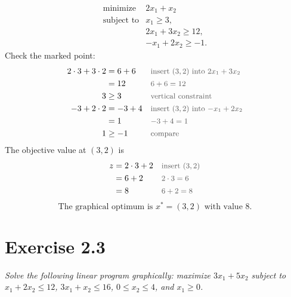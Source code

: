 \documentclass[a4paper,11pt]{article}
\newif\ifexplain
\newcommand{\aufgabe}[1]{\section*{#1}}
\newcommand{\angabe}[1]{\textit{#1}\par\smallskip}
\newcommand{\why}[1]{\text{\small\color{black!65}#1}}
\newcommand{\explain}[1]{\ifexplain\begin{erklbox}#1\end{erklbox}\fi}
\begin{document}
\[
\boxed{
\begin{array}{ll}
\text{minimize} & 2x_1+x_2\\[1mm]
\text{subject to} & x_1\ge3,\\
& 2x_1+3x_2\ge12,\\
& -x_1+2x_2\ge-1.
\end{array}}
\]
Check the marked point:
\begin{align*}
2\cdot3+3\cdot2&=6+6 && \why{insert $(3,2)$ into $2x_1+3x_2$}\\
&=12 && \why{$6+6=12$}\\
3&\ge3 && \why{vertical constraint}\\
-3+2\cdot2&=-3+4 && \why{insert $(3,2)$ into $-x_1+2x_2$}\\
&=1 && \why{$-3+4=1$}\\
1&\ge-1 && \why{compare}
\end{align*}
The objective value at $(3,2)$ is
\begin{align*}
z&=2\cdot3+2 && \why{insert $(3,2)$}\\
&=6+2 && \why{$2\cdot3=6$}\\
&=8 && \why{$6+2=8$}
\end{align*}
\[
\boxed{\text{The graphical optimum is }x^*=(3,2)\text{ with value }8.}
\]

\aufgabe{Exercise 2.3}
\angabe{Solve the following linear program graphically: maximize $3x_1+5x_2$ subject to $x_1+2x_2\le12$, $3x_1+x_2\le16$, $0\le x_2\le4$, and $x_1\ge0$.}
\explain{Beim graphischen Lösen reichen die Eckpunkte der zulässigen Menge: Bei einem linearen Programm nimmt eine lineare Zielfunktion ihr Optimum, falls es existiert, an einem Eckpunkt an. Wir bestimmen die Eckpunkte und vergleichen dort die Zielfunktionswerte.}
\end{document}
